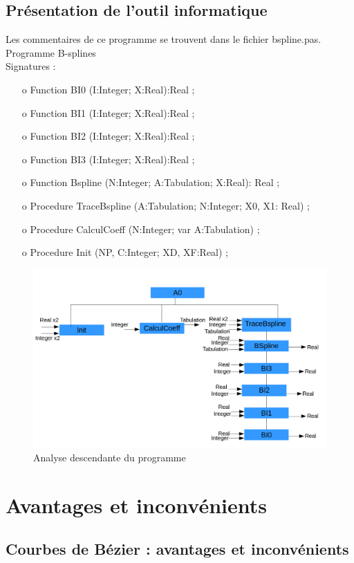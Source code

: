 \documentclass{article}
\begin{document}
\newpage
\subsection{Pr\'esentation de l'outil informatique}
\begingroup\raggedleft
Les commentaires de ce programme se trouvent dans le fichier bspline.pas.
Programme B-splines
\endgroup
\\
Signatures :
\begin{itemize}
\item [o] Function BI0 (I:Integer; X:Real):Real ;
\item [o] Function BI1 (I:Integer; X:Real):Real ;
\item [o] Function BI2 (I:Integer; X:Real):Real ;
\item [o] Function BI3 (I:Integer; X:Real):Real ;
\item [o] Function Bspline (N:Integer; A:Tabulation; X:Real): Real ;
\item [o] Procedure TraceBspline (A:Tabulation; N:Integer; X0, X1: Real) ;
\item [o] Procedure CalculCoeff (N:Integer; var A:Tabulation) ;
\item [o] Procedure Init (NP, C:Integer; XD, XF:Real) ;
\end{itemize}

\begin{figure}[h]
	\centering
	\includegraphics[width=15cm]{Analyse-Descendante-bspline.png}
	\caption{Analyse descendante du programme}
\end{figure}

\newpage
\section{Avantages et inconv\'{e}nients}
\subsection{Courbes de B\'{e}zier : avantages et inconv\'{e}nients}
\end{document}
